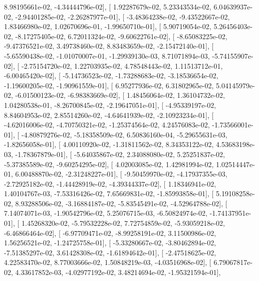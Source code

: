 \documentclass{article}
\begin{document}
          8.98195661e-02,  -4.34444796e-02],
       [  1.92287679e-02,   5.23343534e-02,   6.04639937e-02,
         -2.94401285e-02,  -2.26287977e-01],
       [ -3.48364238e-02,  -9.43522667e-02,   1.83466980e-02,
          1.02670696e-01,  -1.99650710e-01],
       [  5.90719054e-02,   5.26456403e-02,  -8.17275405e-02,
          6.72011324e-02,  -9.60622761e-02],
       [ -8.65083225e-02,  -9.47376521e-02,   3.49738460e-02,
          8.83483659e-02,  -2.15472140e-01],
       [ -5.65590438e-02,  -1.01070007e-01,  -1.29939130e-03,
          8.71071894e-03,  -5.74155907e-02],
       [ -2.75154720e-02,   1.22703935e-02,   4.78548443e-02,
          1.11513712e-01,  -6.00465420e-02],
       [ -5.14736523e-02,  -1.73288683e-02,  -3.18536654e-02,
         -1.19600205e-02,  -1.90961559e-01],
       [  6.95277936e-02,   6.31802965e-02,   5.04145979e-02,
         -6.01500123e-02,  -6.98383669e-02],
       [  1.48456064e-02,   1.36104732e-02,   1.04280538e-01,
         -8.26700845e-02,  -2.19647051e-01],
       [ -4.95339197e-02,   8.84604953e-02,   2.85514260e-02,
         -4.64641939e-02,  -2.10923234e-01],
       [ -4.62016006e-02,  -4.70750321e-02,  -1.25374564e-02,
          4.24576083e-02,  -1.73566001e-01],
       [ -4.80879276e-02,  -5.18358509e-02,   6.50836160e-04,
         -5.29655631e-03,  -1.82656058e-01],
       [  4.00110920e-02,  -1.31811562e-02,   8.34353122e-02,
          4.53683198e-03,  -1.78367879e-01],
       [ -5.64035867e-02,   2.34088080e-02,   5.25251837e-02,
         -5.37385589e-02,  -9.60254295e-02],
       [  4.02003085e-02,   1.42981994e-02,   1.02514447e-01,
          6.00488870e-02,  -2.31248227e-01],
       [ -9.50459970e-02,  -4.17937355e-03,  -2.72925182e-02,
         -1.44428919e-02,  -4.39344337e-02],
       [  1.18346941e-02,   1.40104767e-03,  -7.53316426e-02,
          7.65669831e-02,  -1.85993858e-01],
       [  5.19108258e-02,   8.93288506e-02,  -3.16884187e-02,
         -5.83545491e-02,  -4.52964788e-02],
       [  7.14074071e-03,  -1.90542796e-02,   5.25076715e-03,
         -6.50824974e-02,  -1.74137951e-01],
       [  1.45268320e-02,  -5.79532228e-02,   7.72754859e-02,
         -5.93059218e-02,  -6.46866464e-02],
       [ -6.97709471e-02,  -8.99258191e-02,   3.11500986e-02,
          1.56256521e-02,  -1.24725758e-01],
       [ -5.33280667e-02,  -3.80462894e-02,  -7.51385297e-02,
          3.61428308e-02,  -1.61894642e-01],
       [ -2.47518625e-02,   4.22583470e-02,   8.77003666e-02,
          1.50848219e-03,  -4.03516968e-02],
       [  6.79067817e-02,   4.33617852e-03,  -4.02977192e-02,
          3.48214694e-02,  -1.95321594e-01],
\end{document}
